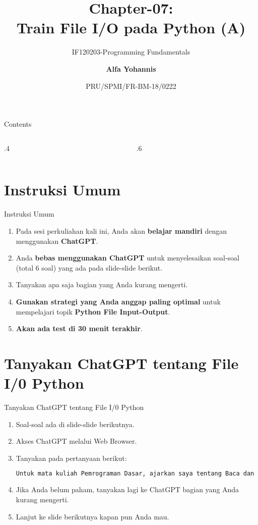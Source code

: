 \documentclass[aspectratio=169, table]{beamer}
\subtitle{IF120203-Programming Fundamentals}
\title{Chapter-07:\\\LARGE{Train File I/O pada Python (A)\\}
\vspace{10pt}}
\date[Serial]{\scriptsize {PRU/SPMI/FR-BM-18/0222}}
\author[Pradita]{\small{\textbf{Alfa Yohannis}}}
\begin{document}
\frame{\titlepage}

\begin{frame}[fragile]{Contents}
\vspace{15pt}
\begin{columns}[t]
\begin{column}{.4\textwidth}
\tableofcontents[sections={1-4}]
\end{column}
\begin{column}{.6\textwidth}
\tableofcontents[sections={5-7}]
\end{column}
\end{columns}
\end{frame}

\section{Instruksi Umum}
\begin{frame}[fragile]{Instruksi Umum}
\begin{enumerate}
\item Pada sesi perkuliahan kali ini, Anda akan \textbf{belajar mandiri} dengan menggunakan \textbf{ChatGPT}.
\item Anda \textbf{bebas menggunakan ChatGPT} untuk menyelesaikan soal-soal (total 6 soal) yang ada pada slide-slide berikut.
\item Tanyakan apa saja bagian yang Anda kurang mengerti.
\item \textbf{Gunakan strategi yang Anda anggap paling optimal} untuk mempelajari topik \textbf{Python File Input-Output}.
\item \textbf{Akan ada test di 30 menit terakhir}.
\end{enumerate}
\end{frame}

\section{Tanyakan ChatGPT tentang File I/0 Python }
\begin{frame}[fragile]{Tanyakan ChatGPT tentang File I/0 Python}
\vspace{20pt}
\centering
\begin{enumerate}
\item Soal-soal ada di slide-slide berikutnya.
\item Akses ChatGPT melalui Web Browser.
\item Tanyakan pada pertanyaan berikut:
\begin{lstlisting}[language=bash]
Untuk mata kuliah Pemrograman Dasar, ajarkan saya tentang Baca dan tulis File di Python yang mencakup (1) membaca dan menulis file teks, (2) penyaringan dan penghitungan data, (3) membaca dan menulis file CSV, dan (2) agregasi dan ringkasan data.
\end{lstlisting}
\item Jika Anda belum paham, tanyakan lagi ke ChatGPT bagian yang Anda kurang mengerti.
\item Lanjut ke slide berikutnya kapan pun Anda mau.
\end{enumerate}
\end{frame}
\end{document}
